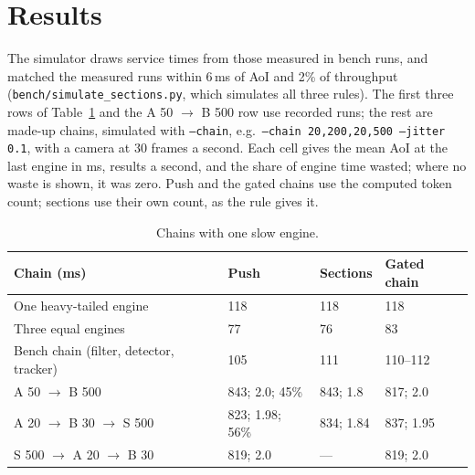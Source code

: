 \documentclass[11pt]{article}
\newcommand{\code}[1]{\texttt{#1}}
\begin{document}
\section{Results}

The simulator draws service times from those measured in bench runs, and
matched the measured runs within 6\,ms of AoI and 2\% of throughput
(\code{bench/simulate\_sections.py}, which simulates all three rules). The
first three rows of Table~\ref{tab:one} and the A 50 $\to$ B 500 row use
recorded runs; the rest are made-up chains, simulated with
\code{--chain}, e.g.\ \code{--chain 20,200,20,500 --jitter 0.1}, with a
camera at 30 frames a second. Each cell gives the mean AoI at the last
engine in ms, results a second, and the share of engine time wasted; where
no waste is shown, it was zero. Push and the gated chains use the
computed token count; sections use their own count, as the rule gives it.

\begin{table}[h]
\centering
\small
\begin{tabular}{@{}llll@{}}
\toprule
Chain (ms) & Push & Sections & Gated chain \\
\midrule
One heavy-tailed engine  & 118 & 118 & 118 \\
Three equal engines      & 77  & 76  & 83 \\
Bench chain (filter, detector, tracker) & 105 & 111 & 110--112 \\
A 50 $\to$ B 500         & 843; 2.0; 45\% & 843; 1.8 & 817; 2.0 \\
A 20 $\to$ B 30 $\to$ S 500 & 823; 1.98; 56\% & 834; 1.84 & 837; 1.95 \\
S 500 $\to$ A 20 $\to$ B 30 & 819; 2.0 & --- & 819; 2.0 \\
\bottomrule
\end{tabular}
\caption{Chains with one slow engine.}
\label{tab:one}
\end{table}
\end{document}
